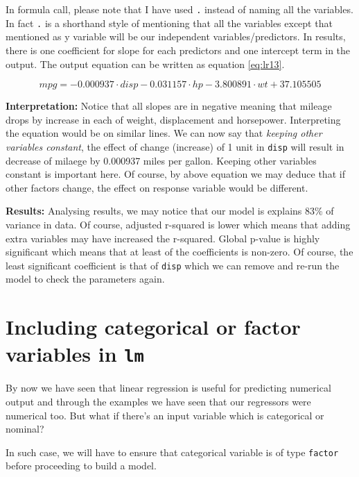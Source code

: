 \documentclass[
]{book}
\begin{document}
In formula call, please note that I have used \texttt{.} instead of naming all the variables. In fact \texttt{.} is a shorthand style of mentioning that all the variables except that mentioned as y variable will be our independent variables/predictors. In results, there is one coefficient for slope for each predictors and one intercept term in the output. The output equation can be written as equation \eqref{eq:lr13}.

\begin{equation} 
{mpg} = -0.000937\cdot{disp} - 0.031157\cdot{hp} - 3.800891\cdot{wt} + 37.105505
\label{eq:lr13}
\end{equation}

\textbf{Interpretation:} Notice that all slopes are in negative meaning that mileage drops by increase in each of weight, displacement and horsepower. Interpreting the equation would be on similar lines. We can now say that \emph{keeping other variables constant}, the effect of change (increase) of 1 unit in \texttt{disp} will result in decrease of milaege by 0.000937 miles per gallon. Keeping other variables constant is important here. Of course, by above equation we may deduce that if other factors change, the effect on response variable would be different.

\textbf{Results:} Analysing results, we may notice that our model is explains 83\% of variance in data. Of course, adjusted r-squared is lower which means that adding extra variables may have increased the r-squared. Global p-value is highly significant which means that at least of the coefficients is non-zero. Of course, the least significant coefficient is that of \texttt{disp} which we can remove and re-run the model to check the parameters again.

\hypertarget{including-categorical-or-factor-variables-in-lm}{%
\section{\texorpdfstring{Including categorical or factor variables in \texttt{lm}}{Including categorical or factor variables in lm}}\label{including-categorical-or-factor-variables-in-lm}}

By now we have seen that linear regression is useful for predicting numerical output and through the examples we have seen that our regressors were numerical too. But what if there's an input variable which is categorical or nominal?

In such case, we will have to ensure that categorical variable is of type \texttt{factor} before proceeding to build a model.
\end{document}
